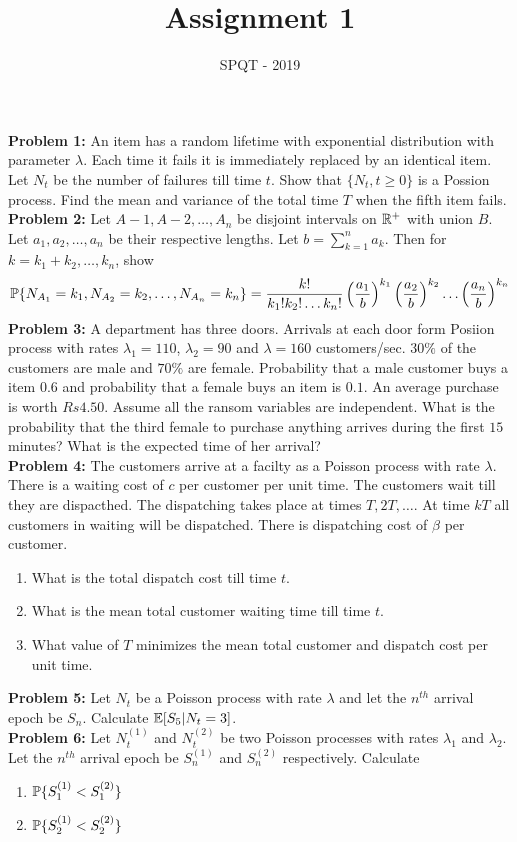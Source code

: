\documentclass[a4paper,10pt,english]{article}
\title{Assignment 1}
\author{SPQT - 2019}
\begin{document}
\maketitle
\textbf{Problem 1:} An item has a random lifetime with exponential distribution with parameter $\lambda$. Each time it fails it is immediately replaced by an identical item. Let $N_t$ be the number of failures till time $t$. Show that $\{N_t, t \geq 0\}$ is a Possion process. Find the mean and variance of the total time $T$ when the fifth item fails. \\
\indent \textbf{Problem 2:} Let $A-1, A-2, \ldots, A_n$ be disjoint intervals on $\R^+$ with union $B$. Let $a_1,a_2,\ldots,a_n$ be their respective lengths. Let $b = \sum_{k=1}^n a_k$. Then for $k = k_1+k_2,\ldots,k_n$, show 
\begin{align*}
\P\{N_{A_1}=k_1,N_{A_2}=k_2,\ldots,N_{A_n}=k_n\} = \frac{k!}{k_1!k_2!\ldots k_n!}\left(\frac{a_1}{b}\right)^{k_1}\left(\frac{a_2}{b}\right)^{k_2}\ldots\left(\frac{a_n}{b}\right)^{k_n}
\end{align*}
\indent \textbf{Problem 3:} A department has three doors. Arrivals at each door form Posiion process with rates $\lambda_1 = 110$, $\lambda_2 = 90$ and $\lambda = 160$ customers/sec. $30\%$ of the customers are male and $70\%$ are female. Probability that a male customer buys a item $0.6$ and probability that a female buys an item is $0.1$. An average purchase is worth $Rs 4.50$. Assume all the ransom variables are independent. What is the probability that the third female to purchase anything arrives during the first $15$ minutes? What is the expected time of her arrival?\\
\indent \textbf{Problem 4:} The customers arrive at a facilty as a Poisson process with rate $\lambda$. There is a waiting cost of $c$ per customer per unit time. The customers wait till they are dispacthed. The dispatching takes place at times $T,2T,\ldots$. At time $kT$ all customers in waiting will be dispatched. There is dispatching cost of $\beta$ per customer. 
\begin{enumerate}
\item What is the total dispatch cost till time $t$.
\item What is the mean total customer waiting time till time $t$.
\item What value of $T$ minimizes the mean total customer and dispatch cost per unit time. 
\end{enumerate}

\indent \textbf{Problem 5:} Let $N_t$ be a Poisson process with rate $\lambda$ and let the $n^{th}$ arrival epoch be $S_n$. Calculate $\E[S_5|N_t = 3]$. \\
\indent \textbf{Problem 6:} Let $N^{(1)}_t$ and $N^{(2)}_t$ be two  Poisson processes with rates $\lambda_1$ and $\lambda_2$. Let the $n^{th}$ arrival epoch be $S^{(1)}_n$ and $S^{(2)}_n$ respectively. Calculate
\begin{enumerate}
\item $\P\{ S^{(1)}_1 < S^{(2)}_1\}$
\item $\P\{ S^{(1)}_2 < S^{(2)}_2\}$
\end{enumerate} 
\end{document}
